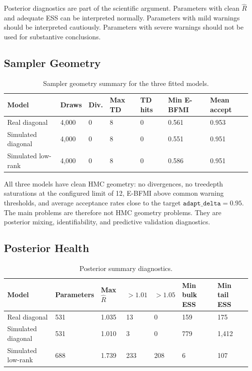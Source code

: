 \documentclass[11pt]{article}
\begin{document}
Posterior diagnostics are part of the scientific argument. Parameters with
clean \(\widehat{R}\) and adequate ESS can be interpreted normally. Parameters
with mild warnings should be interpreted cautiously. Parameters with severe
warnings should not be used for substantive conclusions.

\subsection{Sampler Geometry}

\begin{table}[htbp]
\centering
\small
\caption{Sampler geometry summary for the three fitted models.}
\label{tab:sampler-geometry}
\begin{tabular}{L{0.23\textwidth}R{0.09\textwidth}R{0.08\textwidth}R{0.09\textwidth}R{0.10\textwidth}R{0.11\textwidth}R{0.11\textwidth}}
\toprule
Model & Draws & Div. & Max TD & TD hits & Min E-BFMI & Mean accept \\
\midrule
Real diagonal & 4,000 & 0 & 8 & 0 & 0.561 & 0.953 \\
Simulated diagonal & 4,000 & 0 & 8 & 0 & 0.551 & 0.951 \\
Simulated low-rank & 4,000 & 0 & 8 & 0 & 0.586 & 0.951 \\
\bottomrule
\end{tabular}
\end{table}

All three models have clean HMC geometry: no divergences, no treedepth
saturations at the configured limit of 12, E-BFMI above common warning
thresholds, and average acceptance rates close to the target
\(\texttt{adapt\_delta}=0.95\). The main problems are therefore not HMC
geometry problems. They are posterior mixing, identifiability, and predictive
validation diagnostics.

\subsection{Posterior Health}

\begin{table}[htbp]
\centering
\small
\caption{Posterior summary diagnostics.}
\label{tab:posterior-health}
\begin{tabular}{L{0.21\textwidth}R{0.12\textwidth}R{0.09\textwidth}R{0.08\textwidth}R{0.08\textwidth}R{0.11\textwidth}R{0.11\textwidth}}
\toprule
Model & Parameters & Max \(\widehat{R}\) & \(>1.01\) & \(>1.05\) & Min bulk ESS & Min tail ESS \\
\midrule
Real diagonal & 531 & 1.035 & 13 & 0 & 159 & 175 \\
Simulated diagonal & 531 & 1.010 & 3 & 0 & 779 & 1,412 \\
Simulated low-rank & 688 & 1.739 & 233 & 208 & 6 & 107 \\
\bottomrule
\end{tabular}
\end{table}
\end{document}
